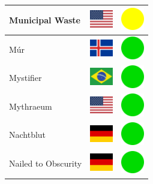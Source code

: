 \documentclass[12pt, a4paper, twoside]{report}
\begin{document}
\begin{center}
\begin{longtable}{|p{5cm}|p{2cm}|p{2cm}|}
 Municipal Waste                                            & \includegraphics[width=1cm]{../4x3/us} &   \includegraphics[width=1cm]{../likes/m} \\ \hline
 Múr                                                        & \includegraphics[width=1cm]{../4x3/is} &   \includegraphics[width=1cm]{../likes/y} \\ \hline
 Mystifier                                                  & \includegraphics[width=1cm]{../4x3/br} &   \includegraphics[width=1cm]{../likes/y} \\ \hline
 Mythraeum                                                  & \includegraphics[width=1cm]{../4x3/us} &   \includegraphics[width=1cm]{../likes/y} \\ \hline
 Nachtblut                                                  & \includegraphics[width=1cm]{../4x3/de} &   \includegraphics[width=1cm]{../likes/y} \\ \hline
 Nailed to Obscurity                                        & \includegraphics[width=1cm]{../4x3/de} &   \includegraphics[width=1cm]{../likes/y} \\ \hline

\end{longtable}
\end{center}
\end{document}
